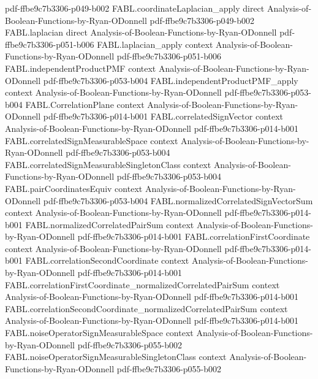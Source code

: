 \begin{theorem}
  {pdf-ffbe9c7b3306-p049-b002}
\proofstep
  {FABL.coordinateLaplacian_apply}
  {direct}
  {Analysis-of-Boolean-Functions-by-Ryan-ODonnell}
  {pdf-ffbe9c7b3306-p049-b002}
\proofstep
  {FABL.laplacian}
  {direct}
  {Analysis-of-Boolean-Functions-by-Ryan-ODonnell}
  {pdf-ffbe9c7b3306-p051-b006}
\proofstep
  {FABL.laplacian_apply}
  {context}
  {Analysis-of-Boolean-Functions-by-Ryan-ODonnell}
  {pdf-ffbe9c7b3306-p051-b006}
\proofstep
  {FABL.independentProductPMF}
  {context}
  {Analysis-of-Boolean-Functions-by-Ryan-ODonnell}
  {pdf-ffbe9c7b3306-p053-b004}
\proofstep
  {FABL.independentProductPMF_apply}
  {context}
  {Analysis-of-Boolean-Functions-by-Ryan-ODonnell}
  {pdf-ffbe9c7b3306-p053-b004}
\proofstep
  {FABL.CorrelationPlane}
  {context}
  {Analysis-of-Boolean-Functions-by-Ryan-ODonnell}
  {pdf-ffbe9c7b3306-p014-b001}
\proofstep
  {FABL.correlatedSignVector}
  {context}
  {Analysis-of-Boolean-Functions-by-Ryan-ODonnell}
  {pdf-ffbe9c7b3306-p014-b001}
\proofstep
  {FABL.correlatedSignMeasurableSpace}
  {context}
  {Analysis-of-Boolean-Functions-by-Ryan-ODonnell}
  {pdf-ffbe9c7b3306-p053-b004}
\proofstep
  {FABL.correlatedSignMeasurableSingletonClass}
  {context}
  {Analysis-of-Boolean-Functions-by-Ryan-ODonnell}
  {pdf-ffbe9c7b3306-p053-b004}
\proofstep
  {FABL.pairCoordinatesEquiv}
  {context}
  {Analysis-of-Boolean-Functions-by-Ryan-ODonnell}
  {pdf-ffbe9c7b3306-p053-b004}
\proofstep
  {FABL.normalizedCorrelatedSignVectorSum}
  {context}
  {Analysis-of-Boolean-Functions-by-Ryan-ODonnell}
  {pdf-ffbe9c7b3306-p014-b001}
\proofstep
  {FABL.normalizedCorrelatedPairSum}
  {context}
  {Analysis-of-Boolean-Functions-by-Ryan-ODonnell}
  {pdf-ffbe9c7b3306-p014-b001}
\proofstep
  {FABL.correlationFirstCoordinate}
  {context}
  {Analysis-of-Boolean-Functions-by-Ryan-ODonnell}
  {pdf-ffbe9c7b3306-p014-b001}
\proofstep
  {FABL.correlationSecondCoordinate}
  {context}
  {Analysis-of-Boolean-Functions-by-Ryan-ODonnell}
  {pdf-ffbe9c7b3306-p014-b001}
\proofstep
  {FABL.correlationFirstCoordinate_normalizedCorrelatedPairSum}
  {context}
  {Analysis-of-Boolean-Functions-by-Ryan-ODonnell}
  {pdf-ffbe9c7b3306-p014-b001}
\proofstep
  {FABL.correlationSecondCoordinate_normalizedCorrelatedPairSum}
  {context}
  {Analysis-of-Boolean-Functions-by-Ryan-ODonnell}
  {pdf-ffbe9c7b3306-p014-b001}
\proofstep
  {FABL.noiseOperatorSignMeasurableSpace}
  {context}
  {Analysis-of-Boolean-Functions-by-Ryan-ODonnell}
  {pdf-ffbe9c7b3306-p055-b002}
\proofstep
  {FABL.noiseOperatorSignMeasurableSingletonClass}
  {context}
  {Analysis-of-Boolean-Functions-by-Ryan-ODonnell}
  {pdf-ffbe9c7b3306-p055-b002}

\end{theorem}
